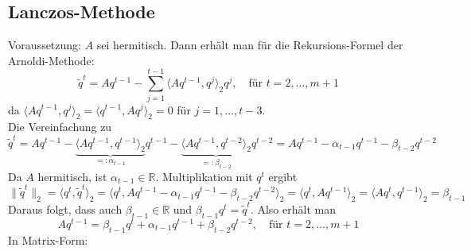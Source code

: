 \subsection{Lanczos-Methode}
Voraussetzung: $A$ sei hermitisch. Dann erhält man für die Rekursions-Formel der Arnoldi-Methode:
\[
    \tilde{q}^t = Aq^{t-1} - \sum_{j=1}^{t-1} \langle Aq^{t-1}, q^j\rangle_2 q^j, \quad \text{für } t=2,\dots,m+1
\]
da $\langle Aq^{t-1}, q^j\rangle_2 = \langle q^{t-1}, Aq^j\rangle_2 = 0$ für $j=1,\dots,t-3$. \\
Die Vereinfachung zu 
\[\tilde{q}^t = Aq^{t-1} - \underbrace{\langle Aq^{t-1}, q^{t-1}\rangle_2}_{=:\alpha_{t-1}} q^{t-1}
- \underbrace{\langle Aq^{t-1}, q^{t-2}\rangle_2}_{=:\beta_{t-2}} q^{t-2} = Aq^{t-1}-\alpha_{t-1}q^{t-1}-\beta_{t-2}q^{t-2}\]
Da $A$ hermitisch, ist $\alpha_{t-1}\in\mathbb{R}$. Multiplikation mit $q^t$ ergibt
\[
    \|\tilde{q}^t\|_2 = \langle q^t, \tilde{q}^t\rangle_2 = \langle q^t, Aq^{t-1}-\alpha_{t-1}q^{t-1}-\beta_{t-2}q^{t-2}\rangle_2 
    = \langle q^t, Aq^{t-1}\rangle_2 = \langle Aq^t, q^{t-1}\rangle_2 = \beta_{t-1}
\]
Daraus folgt, dass auch $\beta_{t-1}\in\mathbb{R}$ und $\beta_{t-1}q^t = \tilde{q}^t$. Also erhält man 
\[
  Aq^{t-1} = \beta_{t-1}q^t + \alpha_{t-1}q^{t-1} + \beta_{t-2}q^{t-2},\quad\text{für } t=2,\dots,m+1
\]
In Matrix-Form:

